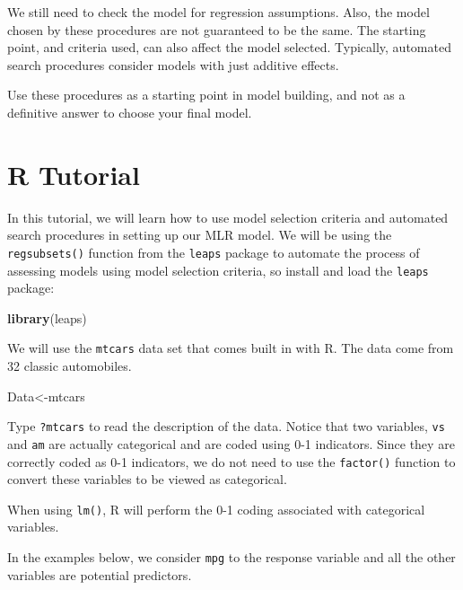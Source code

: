 \documentclass[
]{book}
\newenvironment{Shaded}{\begin{snugshade}}{\end{snugshade}}
\newcommand{\FunctionTok}[1]{\textcolor[rgb]{0.13,0.29,0.53}{\textbf{#1}}}
\newcommand{\NormalTok}[1]{#1}
\newcommand{\OtherTok}[1]{\textcolor[rgb]{0.56,0.35,0.01}{#1}}
\begin{document}
We still need to check the model for regression assumptions. Also, the model chosen by these procedures are not guaranteed to be the same. The starting point, and criteria used, can also affect the model selected. Typically, automated search procedures consider models with just additive effects.

Use these procedures as a starting point in model building, and not as a definitive answer to choose your final model.

\hypertarget{r-tutorial-6}{%
\section{R Tutorial}\label{r-tutorial-6}}

In this tutorial, we will learn how to use model selection criteria and automated search procedures in setting up our MLR model. We will be using the \texttt{regsubsets()} function from the \texttt{leaps} package to automate the process of assessing models using model selection criteria, so install and load the \texttt{leaps} package:

\begin{Shaded}
\begin{Highlighting}[]
\FunctionTok{library}\NormalTok{(leaps)}
\end{Highlighting}
\end{Shaded}

We will use the \texttt{mtcars} data set that comes built in with R. The data come from 32 classic automobiles.

\begin{Shaded}
\begin{Highlighting}[]
\NormalTok{Data}\OtherTok{\textless{}{-}}\NormalTok{mtcars}
\end{Highlighting}
\end{Shaded}

Type \texttt{?mtcars} to read the description of the data. Notice that two variables, \texttt{vs} and \texttt{am} are actually categorical and are coded using 0-1 indicators. Since they are correctly coded as 0-1 indicators, we do not need to use the \texttt{factor()} function to convert these variables to be viewed as categorical.

When using \texttt{lm()}, R will perform the 0-1 coding associated with categorical variables.

In the examples below, we consider \texttt{mpg} to the response variable and all the other variables are potential predictors.
\end{document}
